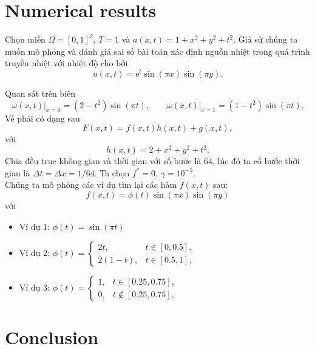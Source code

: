 \documentclass[]{article}
\begin{document}
\section{Numerical results}
\qquad Chọn miền $\Omega=[0, 1]^2$, $T=1$ và
$a(x, t)=1+x^2+y^2+t^2.$ Giả sử chúng ta muốn mô phỏng và đánh giá sai số bài toán xác định nguồn nhiệt trong quá trình truyền nhiệt với nhiệt độ cho bởi
$$u(x, t)=\text{e}^t\sin(\pi x) \sin(\pi y).$$

Quan sát trên biên
$$\left.\omega(x, t)\right|_{x=0}=\left(2-t^2\right)\sin(\pi t),\qquad \left.\omega(x, t)\right|_{x=1}=\left(1-t^2\right)\sin(\pi t).$$
Vế phải có dạng sau
$$F(x, t)=f(x, t)h(x, t)+g(x, t),$$
với
$$h(x, t)=2+x^2+y^2+t^2.$$
Chia đều trục không gian và thời gian với số bước là $64$, lúc đó ta có bước thời gian là $\Delta t=\Delta x=1/64$. Ta chọn $f^*=0$, $\gamma=10^{-5}$.
\\
Chúng ta mô phỏng các ví dụ tìm lại các hàm $f(x, t)$ sau:
$$f(x, t)=\phi(t)\sin(\pi x) \sin(\pi y)$$
với
\begin{itemize}
	\item Ví dụ 1: $\phi(t)=\sin(\pi t)$
	\item Ví dụ 2: 
	$\phi(t)=
	\begin{cases}
	2t, & t\in [0, 0.5],\\
	2(1-t), & t \in [0.5, 1],
	\end{cases}$
	\item Ví dụ 3:
	$\phi(t)=
	\begin{cases}
	1, & t\in [0.25, 0.75],\\
	0, & t \notin [0.25, 0.75],
	\end{cases}$
\end{itemize}


\newpage
\section{Conclusion}

\newpage
{}

\end{document}
